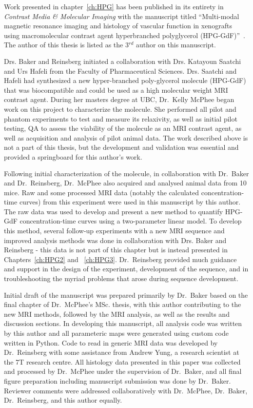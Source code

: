 Work presented in chapter~\ref{ch:HPG} has been published in its entirety in \emph{Contrast Media \& Molecular Imaging} with the manuscript titled ``Multi-modal magnetic resonance imaging and histology of vascular function in xenografts using macromolecular contrast agent hyperbranched polyglycerol (\acs{HPG-GdF})''~\cite{Baker:2015cob}.
The author of this thesis is listed as the 3$^{rd}$ author on this manuscript.

Drs. Baker and Reinsberg initiated a collaboration with Drs. Katayoun Saatchi and Urs Hafeli from the Faculty of Pharmaceutical Sciences.
Drs. Saatchi and Hafeli had synthesized a new hyper-branched poly-glycerol molecule (\acs{HPG-GdF}) that was biocompatible and could be used as a high molecular weight MRI contrast agent.
During her masters degree at UBC, Dr.\ Kelly McPhee began work on this project to characterize the molecule. 
She performed all pilot and phantom experiments to test and measure its relaxivity, as well as initial pilot testing, QA to assess the viability of the molecule as an MRI contrast agent, as well as acquisition and analysis of pilot animal data.
The work described above is not a part of this thesis, but the development and validation was essential and provided a springboard for this author's work.

Following initial characterization of the molecule, in collaboration with Dr.\ Baker and Dr.\ Reinsberg, Dr.\ McPhee also acquired and analysed animal data from 10 mice. 
Raw and some processed MRI data (notably the calculated concentration-time curves) from this experiment were used in this manuscript by this author.
The raw data was used to develop and present a new method to quantify \acs{HPG-GdF} concentration-time curves using a two-parameter linear model.
To develop this method, several follow-up experiments with a new MRI sequence and improved analysis methods was done in collaboration with Drs. Baker and Reinsberg - this data is not part of this chapter but is instead presented in Chapters~\ref{ch:HPG2} and ~\ref{ch:HPG3}.
Dr.\ Reinsberg provided much guidance and support in the design of the experiment, development of the sequence, and in troubleshooting the myriad problems that arose during sequence development.

Initial draft of the manuscript was prepared primarily by Dr.\ Baker based on the final chapter of Dr.\ McPhee's MSc. thesis, with this author contributing to the new MRI methods, followed by the MRI analysis, as well as the results and discussion sections. 
In developing this manuscript, all analysis code was written by this author and all parameteric maps were generated using custom code written in Python.
Code to read in generic MRI data was developed by Dr.\ Reinsberg with some assistance from Andrew Yung, a research scientist at the 7T research centre.
All histology data presented in this paper was collected and processed by Dr.\ McPhee under the supervision of Dr.\ Baker, and all final figure preparation including manuscript submission was done by Dr.\ Baker.
Reviewer comments were addressed collaboratively with Dr.\ McPhee, Dr.\ Baker, Dr.\ Reinsberg, and this author equally.

